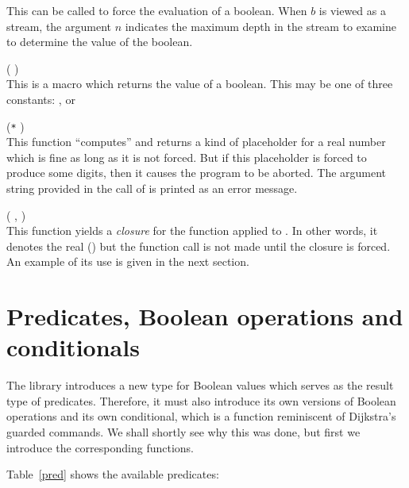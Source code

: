 \documentclass[a4paper,12pt]{article}
\newenvironment{funlist}{\begin{list}%
   {}%
   {\topsep=0pt%
        \leftmargin=0cm%
        \rightmargin=0cm%
        \listparindent=0cm%
        \parskip=10pt%
        \partopsep=0pt%
        \itemsep=0pt%
        \parsep=0pt}}%
   {\end{list}}
\begin{document}
\begin{funlist}
This can be called to force the evaluation of a boolean. When $b$
is viewed as a stream, the argument $n$ indicates the maximum depth in the
stream to examine to determine the value of the boolean.
\vspace{1ex}
\item {} ( ) \\
This is a macro which returns the value of a boolean. This may be
one of three constants:
,
 or
\vspace{1ex}
\item {} (\verb|*| )\\
This function ``computes'' and returns a kind of placeholder
for a real number which is fine as long as it is not forced.
But if this placeholder is forced to produce some digits,
then it causes the program to be aborted.
The argument string provided in the call of 
is printed as an error message.
\item {} ( ,
 )\\
This function yields a \emph{closure} for the function
 applied to . In other words, it denotes the real
() but the function call is not made until
the closure is forced. An example of its use is given
in the next section.
\end{funlist}

\section{Predicates, Boolean operations and conditionals}

The library introduces a new type  for Boolean values
which serves as the result type of predicates.
Therefore, it must also introduce its own versions
of Boolean operations and its own conditional,
which is a function reminiscent of Dijkstra's guarded commands.
We shall shortly see why this was done,
but first we introduce the corresponding functions.

Table~\ref{pred} shows the available predicates:
\end{document}
